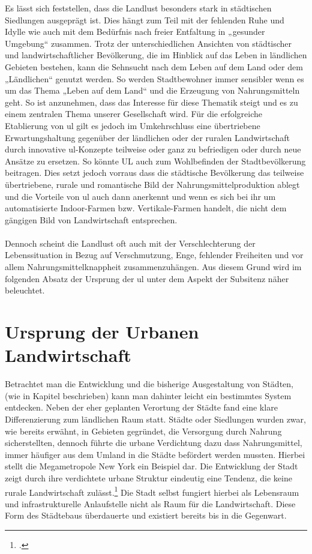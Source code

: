 \documentclass{scrartcl}
\begin{document}
Es lässt sich feststellen, dass die Landlust besonders stark in städtischen Siedlungen ausgeprägt ist. Dies hängt zum Teil mit der fehlenden Ruhe und Idylle wie auch mit dem Bedürfnis nach freier Entfaltung in „gesunder Umgebung“ zusammen. Trotz der unterschiedlichen Ansichten von städtischer und landwirtschaftlicher Bevölkerung, die im Hinblick auf das Leben in ländlichen Gebieten bestehen, kann die Sehnsucht nach dem Leben auf dem Land oder dem „Ländlichen“ genutzt werden. So werden Stadtbewohner immer sensibler wenn es um das Thema „Leben auf dem Land“ und die Erzeugung von Nahrungsmitteln geht. So ist anzunehmen, dass das Interesse für diese Thematik steigt und es zu einem zentralen Thema unserer Gesellschaft wird. Für die erfolgreiche Etablierung von \acs{ul} gilt es jedoch im Umkehrschluss eine übertriebene Erwartungshaltung gegenüber der ländlichen oder der ruralen Landwirtschaft durch innovative \acs{ul}-Konzepte teilweise oder ganz zu befriedigen oder durch neue Ansätze zu ersetzen. So könnte UL auch zum Wohlbefinden der Stadtbevölkerung beitragen. Dies setzt jedoch vorraus dass die städtische Bevölkerung das teilweise übertriebene, rurale und romantische Bild der Nahrungsmittelproduktion ablegt und die Vorteile von {ul} auch dann anerkennt und wenn es sich bei ihr um automatisierte Indoor-Farmen bzw. Vertikale-Farmen handelt, die nicht dem gängigen Bild von Landwirtschaft entsprechen.\\
\\
Dennoch scheint die Landlust oft auch mit der Verschlechterung der Lebenssituation in Bezug auf Verschmutzung, Enge, fehlender Freiheiten und vor allem Nahrungsmittelknappheit zusammenzuhängen. Aus diesem Grund wird im folgenden Absatz der Ursprung der \acs{ul} unter dem Aspekt der Subsitenz näher beleuchtet.

\section{Ursprung der Urbanen Landwirtschaft}

Betrachtet man die Entwicklung und die bisherige Ausgestaltung von Städten, (wie in Kapitel \label{DieDistanzzwischenStadtbevölkerungundLandwirtschaft} beschrieben) kann man dahinter leicht ein bestimmtes System entdecken. Neben der eher geplanten Verortung der Städte fand eine klare Differenzierung zum ländlichen Raum statt. Städte oder Siedlungen wurden zwar, wie bereits erwähnt, in Gebieten gegründet, die Versorgung durch Nahrung sicherstellten, dennoch führte die urbane Verdichtung dazu dass Nahrungsmittel, immer häufiger aus dem Umland in die Städte befördert werden mussten. Hierbei stellt die Megametropole New York ein Beispiel dar. Die Entwicklung der Stadt zeigt durch ihre verdichtete urbane Struktur eindeutig eine Tendenz, die keine rurale Landwirtschaft zulässt.\footcite[Vgl.][S. 146]{MullerUrbanStadt} Die Stadt selbst fungiert hierbei als Lebensraum und infrastrukturelle Anlaufstelle nicht als Raum für die Landwirtschaft. Diese Form des Städtebaus überdauerte und existiert bereits bis in die Gegenwart.
\end{document}
